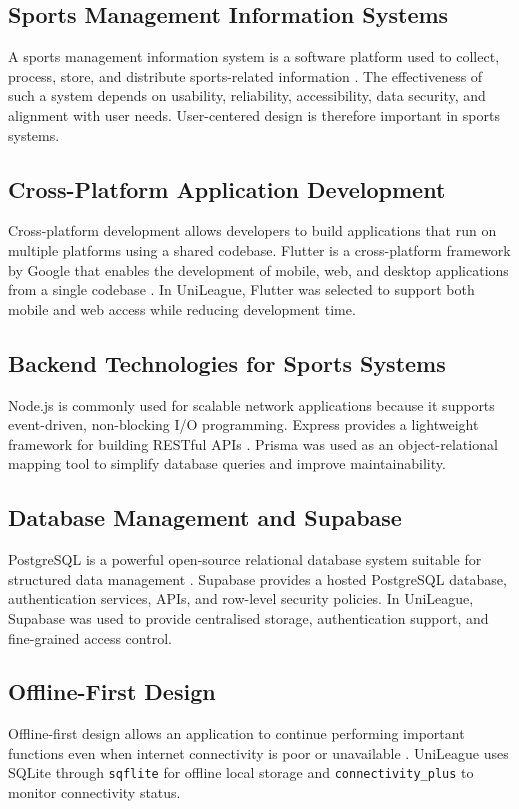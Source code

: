 \documentclass[12pt,a4paper]{report}
\begin{document}
\subsection{Sports Management Information Systems}
A sports management information system is a software platform used to collect, process, store,
and distribute sports-related information \cite{sarlak2024}. The effectiveness of such a
system depends on usability, reliability, accessibility, data security, and alignment with
user needs. User-centered design is therefore important in sports systems.

\subsection{Cross-Platform Application Development}
Cross-platform development allows developers to build applications that run on multiple
platforms using a shared codebase. Flutter is a cross-platform framework by Google that
enables the development of mobile, web, and desktop applications from a single codebase
\cite{flutter2024}. In UniLeague, Flutter was selected to support both mobile and web
access while reducing development time.

\subsection{Backend Technologies for Sports Systems}
Node.js is commonly used for scalable network applications because it supports event-driven,
non-blocking I/O programming. Express provides a lightweight framework for building RESTful
APIs \cite{nodejs2024}. Prisma was used as an object-relational mapping tool to simplify
database queries and improve maintainability.

\subsection{Database Management and Supabase}
PostgreSQL is a powerful open-source relational database system suitable for structured data
management \cite{postgresql2024}. Supabase provides a hosted PostgreSQL database,
authentication services, APIs, and row-level security policies. In UniLeague, Supabase was
used to provide centralised storage, authentication support, and fine-grained access control.

\subsection{Offline-First Design}
Offline-first design allows an application to continue performing important functions even
when internet connectivity is poor or unavailable \cite{sarlak2024}. UniLeague uses SQLite
through \texttt{sqflite} for offline local storage and \texttt{connectivity\_plus} to monitor
connectivity status.
\end{document}
